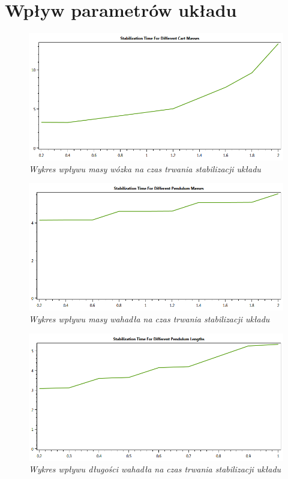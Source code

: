 \documentclass[12pt, oneside]{report}
\theoremstyle{definition}
\begin{document}
\section{Wpływ parametrów układu}
\begin{figure}[H]
	\centering
		\includegraphics[width = 320pt]{CartMassQuality} 
		\caption{\textit{Wykres wpływu masy wózka na czas trwania stabilizacji układu}}
		\label{plot:CartMassQuality}
\end{figure}

\begin{figure}[H]
	\centering
		\includegraphics[width = 320pt]{PendulumMassQuality} 
		\caption{\textit{Wykres wpływu masy wahadła na czas trwania stabilizacji układu}}
		\label{plot:PendulumMassQuality}
\end{figure}

\begin{figure}[H]
	\centering
		\includegraphics[width = 320pt]{PendulumLengthQuality} 
		\caption{\textit{Wykres wpływu długości wahadła na czas trwania stabilizacji układu}}
		\label{plot:PendulumLengthQuality}
\end{figure}
\end{document}
